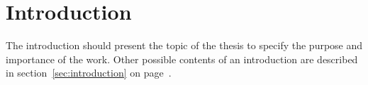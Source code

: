 %
%

\chapter{Introduction}

The introduction should present the topic of the thesis to specify the purpose and 
importance of the work. Other possible contents of an introduction are described 
in section~\ref{sec:introduction} on page~\pageref{sec:introduction}.

